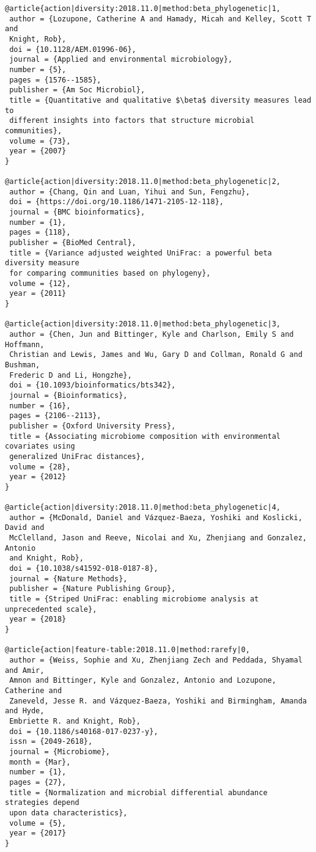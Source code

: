 \begin{footnotesize}
\begin{verbatim}
@article{action|diversity:2018.11.0|method:beta_phylogenetic|1,
 author = {Lozupone, Catherine A and Hamady, Micah and Kelley, Scott T and
 Knight, Rob},
 doi = {10.1128/AEM.01996-06},
 journal = {Applied and environmental microbiology},
 number = {5},
 pages = {1576--1585},
 publisher = {Am Soc Microbiol},
 title = {Quantitative and qualitative $\beta$ diversity measures lead to
 different insights into factors that structure microbial communities},
 volume = {73},
 year = {2007}
}

@article{action|diversity:2018.11.0|method:beta_phylogenetic|2,
 author = {Chang, Qin and Luan, Yihui and Sun, Fengzhu},
 doi = {https://doi.org/10.1186/1471-2105-12-118},
 journal = {BMC bioinformatics},
 number = {1},
 pages = {118},
 publisher = {BioMed Central},
 title = {Variance adjusted weighted UniFrac: a powerful beta diversity measure
 for comparing communities based on phylogeny},
 volume = {12},
 year = {2011}
}

@article{action|diversity:2018.11.0|method:beta_phylogenetic|3,
 author = {Chen, Jun and Bittinger, Kyle and Charlson, Emily S and Hoffmann,
 Christian and Lewis, James and Wu, Gary D and Collman, Ronald G and Bushman,
 Frederic D and Li, Hongzhe},
 doi = {10.1093/bioinformatics/bts342},
 journal = {Bioinformatics},
 number = {16},
 pages = {2106--2113},
 publisher = {Oxford University Press},
 title = {Associating microbiome composition with environmental covariates using
 generalized UniFrac distances},
 volume = {28},
 year = {2012}
}

@article{action|diversity:2018.11.0|method:beta_phylogenetic|4,
 author = {McDonald, Daniel and Vázquez-Baeza, Yoshiki and Koslicki, David and
 McClelland, Jason and Reeve, Nicolai and Xu, Zhenjiang and Gonzalez, Antonio
 and Knight, Rob},
 doi = {10.1038/s41592-018-0187-8},
 journal = {Nature Methods},
 publisher = {Nature Publishing Group},
 title = {Striped UniFrac: enabling microbiome analysis at unprecedented scale},
 year = {2018}
}

@article{action|feature-table:2018.11.0|method:rarefy|0,
 author = {Weiss, Sophie and Xu, Zhenjiang Zech and Peddada, Shyamal and Amir,
 Amnon and Bittinger, Kyle and Gonzalez, Antonio and Lozupone, Catherine and
 Zaneveld, Jesse R. and Vázquez-Baeza, Yoshiki and Birmingham, Amanda and Hyde,
 Embriette R. and Knight, Rob},
 doi = {10.1186/s40168-017-0237-y},
 issn = {2049-2618},
 journal = {Microbiome},
 month = {Mar},
 number = {1},
 pages = {27},
 title = {Normalization and microbial differential abundance strategies depend
 upon data characteristics},
 volume = {5},
 year = {2017}
}


\end{verbatim}
\end{footnotesize}
